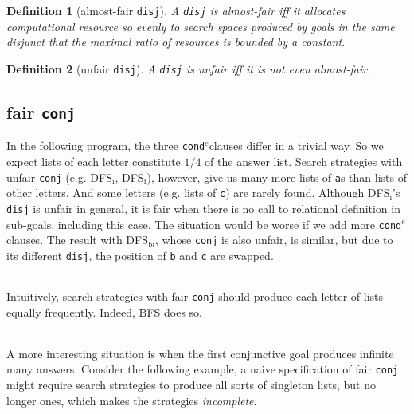 \documentclass[format=acmlarge, review=true, authordraft=true]{acmart}
\newcommand{\conde}{\texttt{cond$^e$}}
\newcommand{\conj}{\texttt{conj}}
\newcommand{\disj}{\texttt{disj}}
\newtheorem{defn}{Definition}[section]
\begin{document}
\begin{defn}[almost-fair \disj{}]
	A \disj{} is almost-fair iff it allocates computational resource so 
	evenly to search spaces produced by goals in the same disjunct that the 
	maximal 
	ratio of resources is bounded by a constant.
\end{defn}

\begin{defn}[unfair \disj{}]
	A \disj{} is unfair iff it is not even almost-fair.
\end{defn}

\subsection{fair \texttt{conj}}

In the following program, the three \conde clauses differ in a trivial way. So 
we expect lists of each letter constitute $1/4$ of the answer list. Search 
strategies with unfair \conj{} (e.g. DFS$_\textrm{i}$, DFS$_\textrm{f}$), 
however, give us many more lists of \texttt{a}s than lists of other letters. 
And some letters (e.g. lists 
of \texttt{c}) are rarely found. Although DFS$_\textrm{i}$'s \disj{} is unfair in general, 
it is fair when there is no call to relational definition in sub-goals, 
including this case. The situation would be worse if we add more \conde 
clauses. The result with DFS$_\textrm{bi}$, whose \conj{} is also unfair, is similar, but 
due to its different \disj{}, the position of \texttt{b} and \texttt{c} are 
swapped. 

\begin{center}
	\begin{tabular}{c}
		
	\end{tabular}
\end{center}

Intuitively, search strategies with fair \conj{} should produce each letter of 
lists equally frequently. Indeed, BFS does so.

\begin{center}
	\begin{tabular}{c|c}
		
	\end{tabular}
\end{center}

A more interesting situation is when the first conjunctive goal produces 
infinite many answers. Consider the following example, a naive specification of 
fair \conj{} might require search strategies to produce all sorts of singleton 
lists, but no longer ones, which makes the strategies \emph{incomplete}. 
\end{document}
